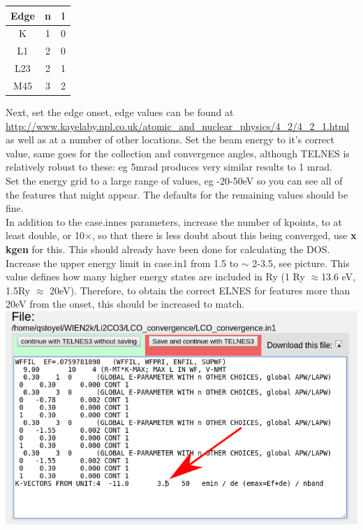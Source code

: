 \documentclass[12pt]{article}
\begin{document}
\begin{table}[H]
	\centering
	\begin{tabular}{ccc}
		
		Edge & n & l \\
		\hline
		K & 1 &0 \\
		L1 & 2 & 0 \\
		L23 & 2 &1\\
		M45 & 3 & 2\\
	\end{tabular}
	
\end{table}

Next, set the edge onset, edge values can be found at \url{http://www.kayelaby.npl.co.uk/atomic_and_nuclear_physics/4_2/4_2_1.html} as well as at a number of other locations.  Set the beam energy to it's correct value, same goes for the collection and convergence angles, although TELNES is relatively robust to these: eg 5mrad produces very similar results to 1 mrad.\\

Set the energy grid to a large range of values, eg -20-50eV so you can see all of the features that might appear.  The defaults for the remaining values should be fine.\\

In addition to the case.innes parameters, increase the number of kpoints, to at least double, or 10$\times$, so that there is less doubt about this being converged, use \textbf{x kgen} for this. This should already have been done for calculating the DOS.   \\

Increase the upper energy limit in case.in1 from 1.5 to $\sim$ 2-3.5, see picture.  This value defines how many higher energy states are included in Ry (1 Ry $\approx$13.6 eV, 1.5Ry $\approx$ 20eV). Therefore, to obtain the correct ELNES for features more than 20eV from the onset,  this should be increased to match.  \\

\includegraphics[scale=0.4]{./images/in1_edit.png}
\end{document}
